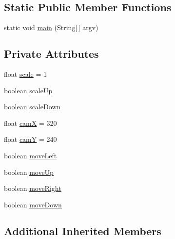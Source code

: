 \subsection*{Static Public Member Functions}
\begin{DoxyCompactItemize}
\item 
static void \mbox{\hyperlink{classorg_1_1newdawn_1_1slick_1_1tests_1_1_transform_test2_a497495f408ce53e3456ec729d465d200}{main}} (String\mbox{[}$\,$\mbox{]} argv)
\end{DoxyCompactItemize}
\subsection*{Private Attributes}
\begin{DoxyCompactItemize}
\item 
float \mbox{\hyperlink{classorg_1_1newdawn_1_1slick_1_1tests_1_1_transform_test2_ad4b1e14a99bd5c87cec5953f4557b767}{scale}} = 1
\item 
boolean \mbox{\hyperlink{classorg_1_1newdawn_1_1slick_1_1tests_1_1_transform_test2_ad5d1f511abd23701eaa9473d3ba5dc39}{scale\+Up}}
\item 
boolean \mbox{\hyperlink{classorg_1_1newdawn_1_1slick_1_1tests_1_1_transform_test2_a048479d9f00dfba8682ccfdac4c18d6e}{scale\+Down}}
\item 
float \mbox{\hyperlink{classorg_1_1newdawn_1_1slick_1_1tests_1_1_transform_test2_ae69ca32e28b0dd1c8b5e363d7382128a}{camX}} = 320
\item 
float \mbox{\hyperlink{classorg_1_1newdawn_1_1slick_1_1tests_1_1_transform_test2_aff7612fabe1d7ed21ecd50575e452a9b}{camY}} = 240
\item 
boolean \mbox{\hyperlink{classorg_1_1newdawn_1_1slick_1_1tests_1_1_transform_test2_ad68834f4b263bb997ccea930ecf0033a}{move\+Left}}
\item 
boolean \mbox{\hyperlink{classorg_1_1newdawn_1_1slick_1_1tests_1_1_transform_test2_a64750778b32660b9c33420532d739ddb}{move\+Up}}
\item 
boolean \mbox{\hyperlink{classorg_1_1newdawn_1_1slick_1_1tests_1_1_transform_test2_a5b9abdc8d57aed44b9718974c01e862d}{move\+Right}}
\item 
boolean \mbox{\hyperlink{classorg_1_1newdawn_1_1slick_1_1tests_1_1_transform_test2_a29d67f3d4d24ae44eecf33a69600e4ac}{move\+Down}}
\end{DoxyCompactItemize}
\subsection*{Additional Inherited Members}


